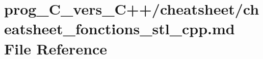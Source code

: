 \hypertarget{prog__C__vers__C_09_09_2cheatsheet_2cheatsheet__fonctions__stl__cpp_8md}{}\section{prog\+\_\+\+C\+\_\+vers\+\_\+\+C++/cheatsheet/cheatsheet\+\_\+fonctions\+\_\+stl\+\_\+cpp.md File Reference}
\label{prog__C__vers__C_09_09_2cheatsheet_2cheatsheet__fonctions__stl__cpp_8md}
